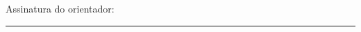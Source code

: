 \documentclass[12pt,twoside]{article}
\begin{document}
    \vspace*{1cm} Assinatura do orientador: \ \rule{8cm}{1pt} \\
    

  \thispagestyle{empty} %
\end{document}
